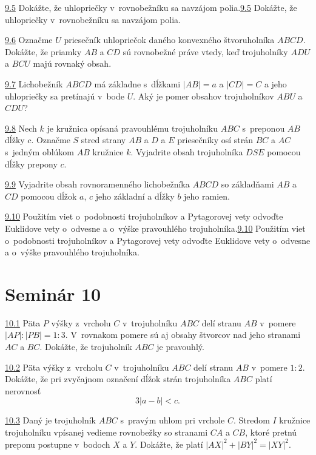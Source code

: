 \noindent \ul{9.5} Dokážte, že uhlopriečky v~rovnobežníku sa navzájom polia.\ul{9.5} Dokážte, že uhlopriečky v~rovnobežníku sa navzájom polia.




\noindent \ul{9.6}   Označme $U$ priesečník uhlopriečok daného konvexného štvoruholníka $ABCD$. Dokážte, že priamky $AB$ a $CD$ sú rovnobežné práve vtedy, keď trojuholníky $ADU$ a $BCU$ majú rovnaký obsah.




\noindent \ul{9.7}  Lichobežník $ABCD$ má základne s~dĺžkami $|AB|=a$ a $|CD|=C$ a jeho uhlopriečky sa pretínajú v~bode $U$. Aký je pomer obsahov trojuholníkov $ABU$ a $CDU$?




\noindent \ul{9.8}  Nech $k$ je kružnica opísaná pravouhlému trojuholníku $ABC$ s~preponou $AB$ dĺžky $c$. Označme $S$ stred strany $AB$ a $D$ a $E$ priesečníky osí strán $BC$ a $AC$ s~jedným oblúkom $AB$ kružnice $k$. Vyjadrite obsah trojuholníka $DSE$ pomocou dĺžky prepony $c$.




\noindent \ul{9.9}  Vyjadrite obsah rovnoramenného lichobežníka $ABCD$ so základňami $AB$ a $CD$ pomocou dĺžok $a$, $c$ jeho základní a dĺžky $b$ jeho ramien.




\noindent \ul{9.10} Použitím viet o~podobnosti trojuholníkov a Pytagorovej vety odvoďte Euklidove vety o~odvesne a o~výške pravouhlého trojuholníka.\ul{9.10} Použitím viet o~podobnosti trojuholníkov a Pytagorovej vety odvoďte Euklidove vety o~odvesne a o~výške pravouhlého trojuholníka.



\section*{Seminár 10}

\noindent \ul{10.1}  Päta $P$ výšky z~vrcholu $C$ v~trojuholníku $ABC$ delí stranu $AB$ v~pomere $|AP| : |PB|= 1 : 3$. V~rovnakom pomere sú aj obsahy štvorcov nad jeho stranami $AC$ a $BC$.
Dokážte, že trojuholník $ABC$ je pravouhlý.



\noindent \ul{10.2} 
Päta výšky z~vrcholu $C$ v~trojuholníku $ABC$ delí stranu $AB$ v~pomere $1 : 2$. Dokážte, že pri zvyčajnom označení dĺžok strán trojuholníka $ABC$ platí nerovnosť $$3|a - b| < c.$$



\noindent \ul{10.3} 
Daný je trojuholník $ABC$ s~pravým uhlom pri vrchole $C$. Stredom $I$ kružnice trojuholníku vpísanej vedieme rovnobežky so stranami $CA$ a $CB$, ktoré pretnú preponu postupne v~bodoch $X$ a $Y$. Dokážte, že platí $|AX|^2 + |BY |^2 = |XY |^2$.




